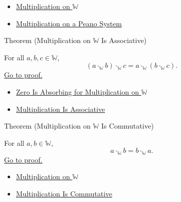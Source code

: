 \begin{dependencies}
\begin{itemize}
  \item \hyperref[def:multiplication-on-w]{Multiplication on $\mathbb{W}$}
  \item \hyperref[def:multiplication-on-peano-system]{Multiplication on a Peano System}
\end{itemize}
\end{dependencies}

\begin{theorembox}{Theorem (Multiplication on \texorpdfstring{$\mathbb{W}$}{W} Is Associative)}
\begin{theorem}
\label{thm:multiplication-on-w-associative}
For all $a,b,c\in\mathbb{W}$,
\[
(a\cdot_{\mathbb{W}}b)\cdot_{\mathbb{W}}c
=
a\cdot_{\mathbb{W}}(b\cdot_{\mathbb{W}}c).
\]
\hyperref[prf:multiplication-on-w-associative]{Go to proof.}
\end{theorem}
\end{theorembox}

\begin{dependencies}
\begin{itemize}
  \item \hyperref[thm:zero-absorbing-for-multiplication-on-w]{Zero Is Absorbing for Multiplication on $\mathbb{W}$}
  \item \hyperref[thm:multiplication-associative]{Multiplication Is Associative}
\end{itemize}
\end{dependencies}

\begin{theorembox}{Theorem (Multiplication on \texorpdfstring{$\mathbb{W}$}{W} Is Commutative)}
\begin{theorem}
\label{thm:multiplication-on-w-commutative}
For all $a,b\in\mathbb{W}$,
\[
a\cdot_{\mathbb{W}}b=b\cdot_{\mathbb{W}}a.
\]
\hyperref[prf:multiplication-on-w-commutative]{Go to proof.}
\end{theorem}
\end{theorembox}

\begin{dependencies}
\begin{itemize}
  \item \hyperref[def:multiplication-on-w]{Multiplication on $\mathbb{W}$}
  \item \hyperref[thm:multiplication-commutative]{Multiplication Is Commutative}
\end{itemize}
\end{dependencies}

